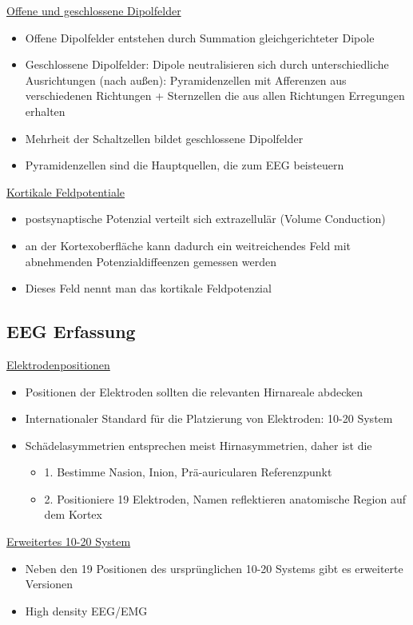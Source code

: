 \documentclass[a4paper,10pt,oneside]{article}
\begin{document}
\underline{Offene und geschlossene Dipolfelder} \\
	\begin{itemize}
		\item Offene Dipolfelder entstehen durch Summation gleichgerichteter Dipole
		\item Geschlossene Dipolfelder: Dipole neutralisieren sich durch unterschiedliche Ausrichtungen (nach außen): Pyramidenzellen mit Afferenzen aus verschiedenen Richtungen + Sternzellen die aus allen Richtungen Erregungen erhalten
		\item Mehrheit der Schaltzellen bildet geschlossene Dipolfelder
		\item Pyramidenzellen sind die Hauptquellen, die zum EEG beisteuern
	\end{itemize}
	
\underline{Kortikale Feldpotentiale} \\
	\begin{itemize}
		\item postsynaptische Potenzial verteilt sich extrazellulär (Volume Conduction)
		\item an der Kortexoberfläche kann dadurch ein weitreichendes Feld mit abnehmenden Potenzialdiffeenzen gemessen werden
		\item Dieses Feld nennt man das kortikale Feldpotenzial
	\end{itemize}
	
\subsection{EEG Erfassung}
\underline{Elektrodenpositionen} \\
	\begin{itemize}
		\item Positionen der Elektroden sollten die relevanten Hirnareale abdecken
		\item Internationaler Standard für die Platzierung von Elektroden: 10-20 System
		\item Schädelasymmetrien entsprechen meist Hirnasymmetrien, daher ist die 
			\begin{itemize}
				\item 1. Bestimme Nasion, Inion, Prä-auricularen Referenzpunkt
				\item 2. Positioniere 19 Elektroden, Namen reflektieren anatomische Region auf dem Kortex 
			\end{itemize}
	\end{itemize}
	
\underline{Erweitertes 10-20 System} \\
	\begin{itemize}
		\item Neben den 19 Positionen des ursprünglichen 10-20 Systems gibt es erweiterte Versionen
		\item High density EEG/EMG
	\end{itemize}
	
\end{document}
